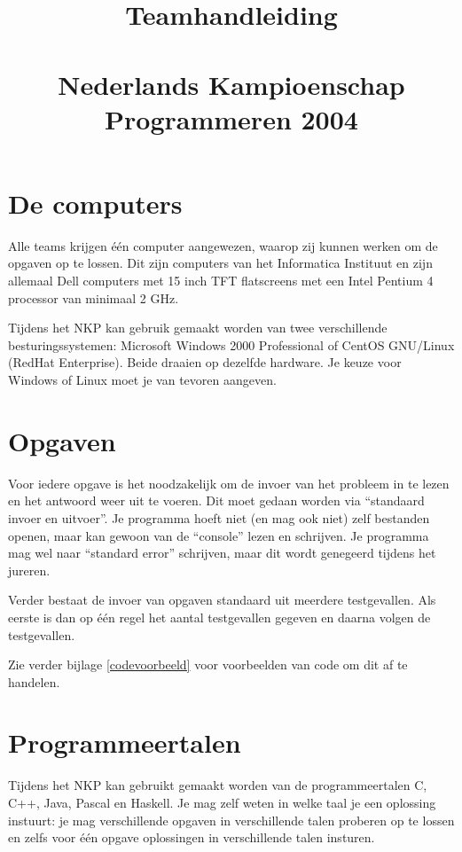 \documentclass[11pt,titlepage,a4paper]{article}
\title{Teamhandleiding\\~\\Nederlands Kampioenschap Programmeren 2004}
\begin{document}
\maketitle

\tableofcontents


\newpage
\section{De computers}

Alle teams krijgen \'e\'en computer aangewezen, waarop zij kunnen
werken om de opgaven op te lossen. Dit zijn computers van het
Informatica Instituut en zijn allemaal Dell computers met 15 inch TFT
flatscreens met een Intel Pentium 4 processor van minimaal 2 GHz.

Tijdens het NKP kan gebruik gemaakt worden van twee verschillende
besturingssystemen: Microsoft Windows 2000 Professional of
CentOS GNU/Linux (RedHat Enterprise). Beide draaien op dezelfde
hardware. Je keuze voor Windows of Linux moet je van tevoren
aangeven.

\section{Opgaven}

Voor iedere opgave is het noodzakelijk om de invoer van het probleem
in te lezen en het antwoord weer uit te voeren. Dit moet gedaan worden
via ``standaard invoer en uitvoer''. Je programma hoeft niet (en mag
ook niet) zelf bestanden openen, maar kan gewoon van de ``console''
lezen en schrijven. Je programma mag wel naar ``standard error''
schrijven, maar dit wordt genegeerd tijdens het jureren.

Verder bestaat de invoer van opgaven standaard uit meerdere
testgevallen. Als eerste is dan op \'e\'en regel het aantal
testgevallen gegeven en daarna volgen de testgevallen.

Zie verder bijlage \ref{codevoorbeeld} voor voorbeelden van code om
dit af te handelen.


\newpage
\section{Programmeertalen}

Tijdens het NKP kan gebruikt gemaakt worden van de programmeertalen C,
C++, Java, Pascal en Haskell. Je mag zelf weten in welke taal je een
oplossing instuurt: je mag verschillende opgaven in verschillende
talen proberen op te lossen en zelfs voor \'e\'en opgave oplossingen
in verschillende talen insturen.
\end{document}
